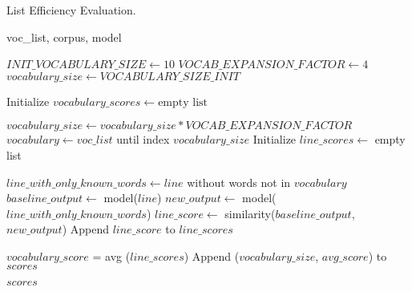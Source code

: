 \begin{algorithm}
\caption{List Efficiency Evaluation.}
\label{alg:efficiency-evaluation}
\begin{algorithmic}[1]
\Require voc\_list, corpus, model

\State $INIT\_VOCABULARY\_SIZE \gets 10$ 
\State $VOCAB\_EXPANSION\_FACTOR \gets 4$    
\State $vocabulary\_size \gets VOCABULARY\_SIZE\_INIT$ 

\State Initialize $vocabulary\_scores \gets \text{empty list}$

    \State $vocabulary\_size \gets vocabulary\_size * VOCAB\_EXPANSION\_FACTOR$ 
    \State $vocabulary \gets voc\_list$ until index $vocabulary\_size$
    \State Initialize $line\_scores \gets$ empty list
    
        \State $line\_with\_only\_known\_words \gets line $ without words not in $vocabulary$
        \State $baseline\_output \gets$ model($line$)
        \State $new\_output \gets$ model($line\_with\_only\_known\_words$)
        \State $line\_score \gets$ similarity($baseline\_output $, $new\_output$)
        \State Append $line\_score$ to $line\_scores$
    \EndFor

    \State $vocabulary\_score$ = avg ($line\_scores$)
    \State Append ($vocabulary\_size$, $avg\_score$) to $scores$
\EndWhile

\State \Return $scores$

\end{algorithmic}
\end{algorithm}
